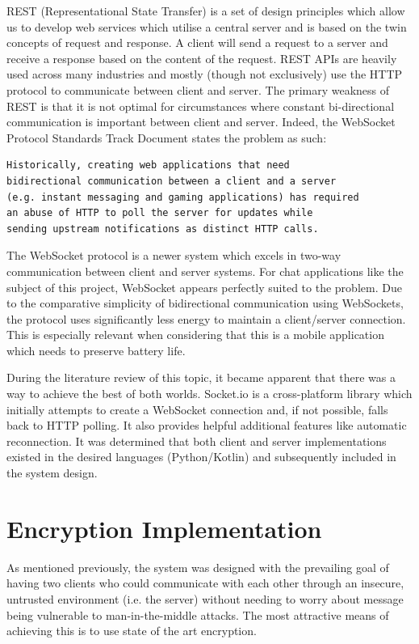 \documentclass{mproj}
\begin{document}
REST (Representational State Transfer) is a set of design principles which allow us to develop web services which utilise a central server and is based on the twin concepts of request and response. A client will send a request to a server and receive a response based on the content of the request. REST APIs are heavily used across many industries and mostly (though not exclusively) use the HTTP protocol to communicate between client and server. The primary weakness of REST is that it is not optimal for circumstances where constant bi-directional communication is important between client and server. Indeed, the WebSocket Protocol Standards Track Document\cite{fette2011websocket} states the problem as such:

\begin{verbatim}
Historically, creating web applications that need 
bidirectional communication between a client and a server 
(e.g. instant messaging and gaming applications) has required 
an abuse of HTTP to poll the server for updates while
sending upstream notifications as distinct HTTP calls.
\end{verbatim}

The WebSocket protocol is a newer system which excels in two-way communication between client and server systems. For chat applications like the subject of this project, WebSocket appears perfectly suited to the problem.  
Due to the comparative simplicity of bidirectional communication using WebSockets, the protocol uses significantly less energy\cite{herwig2015assessment} to maintain a client/server connection. This is especially relevant when considering that this is a mobile application which needs to preserve battery life. 

During the literature review of this topic, it became apparent that there was a way to achieve the best of both worlds. Socket.io\cite{rai2013socket} is a cross-platform library which initially attempts to create a WebSocket connection and, if not possible, falls back to HTTP polling. It also provides helpful additional features like automatic reconnection. It was determined that both client and server implementations existed in the desired languages (Python/Kotlin) and subsequently included in the system design.

\section{Encryption Implementation}\label{encryption}
As mentioned previously, the system was designed with the prevailing goal of having two clients who could communicate with each other through an insecure, untrusted environment (i.e. the server) without needing to worry about message being vulnerable to man-in-the-middle attacks\cite{mallik2019man}. The most attractive means of achieving this is to use state of the art encryption.
\end{document}
